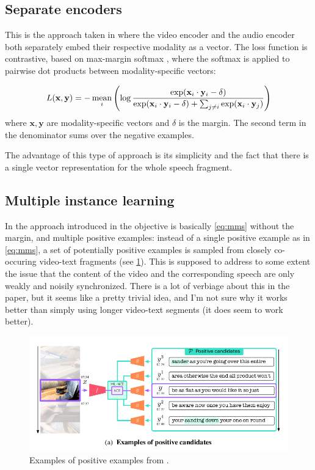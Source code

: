 \subsection{Separate encoders}
This is the approach taken in \citet{rouditchenko2020avlnet} where the
video encoder and the audio encoder both separately embed their
respective modality as a vector. The loss function is contrastive,
based on max-margin softmax \citep{ilharco-etal-2019-large}, where the
softmax is applied to pairwise dot products between modality-specific
vectors:

\begin{equation}
  \label{eq:mms}
  L(\mathbf{x}, \mathbf{y}) = - \operatorname*{mean}_i \left(
    \log \frac{\exp(\mathbf{x}_i\cdot \mathbf{y}_i-\delta)}
    { \exp(\mathbf{x}_i\cdot \mathbf{y}_i-\delta) + \sum_{j\neq i}
      \exp(\mathbf{x}_i \cdot \mathbf{y}_j)  }
  \right)
\end{equation}
where $\mathbf{x, y}$ are modality-specific vectors and $\delta$ is the
margin. The second term in the denominator sums over the negative
examples.

The advantage of this type of approach is its simplicity and the fact
that there is a single vector representation for the whole speech
fragment.

\subsection{Multiple instance learning}
In the approach introduced in \citet{miech2020end} the objective is
basically \cref{eq:mms} without the margin, and multiple positive
examples: instead of a single positive example as in \cref{eq:mms}, a
set of potentially positive examples is sampled from closely
co-occuring video-text fragments (see \cref{fig:positive}). This is
supposed to address to some extent the issue that the content of the
video and the corresponding speech are only weakly and noisily
synchronized. There is a lot of verbiage about this in the paper, but
it seems like a pretty trivial idea, and I'm not sure why it works
better than simply using longer video-text segments (it does seem to
work better).
\begin{figure}
  \centering
  \includegraphics[scale=0.3]{positive}
  \caption{Examples of positive examples from \citet{miech2020end}.}
  \label{fig:positive}
\end{figure}

